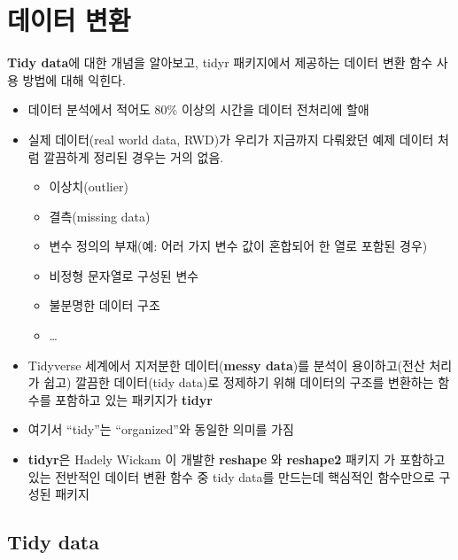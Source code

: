 \documentclass[
  11pt,
]{krantz}
\makeatletter
\providecommand{\tightlist}{%
  \setlength{\itemsep}{0pt}\setlength{\parskip}{0pt}}
\newenvironment{kframe}{%
\medskip{}
\setlength{\fboxsep}{.8em}
 \def\at@end@of@kframe{}%
 \ifinner\ifhmode%
  \def\at@end@of@kframe{\end{minipage}}%
  \begin{minipage}{\columnwidth}%
 \fi\fi%
 \def\FrameCommand##1{\hskip\@totalleftmargin \hskip-\fboxsep
 \colorbox{shadecolor}{##1}\hskip-\fboxsep
     \hskip-\linewidth \hskip-\@totalleftmargin \hskip\columnwidth}%
 \MakeFramed {\advance\hsize-\width
   \@totalleftmargin\z@ \linewidth\hsize
   \@setminipage}}%
 {\par\unskip\endMakeFramed%
 \at@end@of@kframe}
\newenvironment{rmdblock}[1]
  {
  \begin{itemize}
  \renewcommand{\labelitemi}{
    \raisebox{-.7\height}[0pt][0pt]{
      {\setkeys{Gin}{width=3em,keepaspectratio}\texttt{[image: images/\#1]}}
    }
  }
  \setlength{\fboxsep}{1em}
  \begin{kframe}
  \item
  }
  {
  \end{kframe}
  \end{itemize}
  }
\newenvironment{rmdnote}
  {\begin{rmdblock}{note}}
  {\end{rmdblock}}
\makeatother
\begin{document}
\normalsize

\hypertarget{data-transformation}{%
\section{데이터 변환}\label{data-transformation}}

\footnotesize

\begin{rmdnote}
\begin{rmdnote}

\textbf{Tidy data}에 대한 개념을 알아보고, tidyr 패키지에서 제공하는 데이터 변환 함수 사용 방법에 대해 익힌다.

\end{rmdnote}
\end{rmdnote}

\normalsize

\begin{itemize}
\item
  데이터 분석에서 적어도 80\% 이상의 시간을 데이터 전처리에 할애
\item
  실제 데이터(real world data, RWD)가 우리가 지금까지 다뤄왔던 예제 데이터 처럼 깔끔하게 정리된 경우는 거의 없음.

  \begin{itemize}
  \tightlist
  \item
    이상치(outlier)
  \item
    결측(missing data)
  \item
    변수 정의의 부재(예: 어러 가지 변수 값이 혼합되어 한 열로 포함된 경우)
  \item
    비정형 문자열로 구성된 변수
  \item
    불분명한 데이터 구조
  \item
    \ldots{}
  \end{itemize}
\item
  Tidyverse 세계에서 지저분한 데이터(\textbf{messy data})를 분석이 용이하고(전산 처리가 쉽고) 깔끔한 데이터(tidy data)로 정제하기 위해 데이터의 구조를 변환하는 함수를 포함하고 있는 패키지가 \textbf{tidyr}
\item
  여기서 ``tidy''는 ``organized''와 동일한 의미를 가짐
\item
  \textbf{tidyr}은 Hadely Wickam 이 개발한 \textbf{reshape} 와 \textbf{reshape2} 패키지 \citep{wickham-2007p}가 포함하고 있는 전반적인 데이터 변환 함수 중 tidy data를 만드는데 핵심적인 함수만으로 구성된 패키지
\end{itemize}

\hypertarget{tidy-data}{%
\subsection{Tidy data}\label{tidy-data}}
\end{document}
